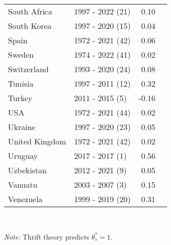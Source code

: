 \begin{table}[H]
{{\begin{tabular}{llrr}
South Africa & 1997 - 2022 (21) & 0.10\\
South Korea & 1997 - 2020 (15) & 0.04\\
Spain & 1972 - 2021 (42) & 0.06\\
\addlinespace
Sweden & 1974 - 2022 (41) & 0.02\\
Switzerland & 1993 - 2020 (24) & 0.08\\
Tunisia & 1997 - 2011 (12) & 0.32\\
Turkey & 2011 - 2015 (5) & -0.16\\
USA & 1972 - 2021 (44) & 0.02\\
\addlinespace
Ukraine & 1997 - 2020 (23) & 0.05\\
United Kingdom & 1972 - 2021 (42) & 0.02\\
Uruguay & 2017 - 2017 (1) & 0.56\\
Uzbekistan & 2012 - 2021 (9) & 0.05\\
Vanuatu & 2003 - 2007 (3) & 0.15\\
\addlinespace
Venezuela & 1999 - 2019 (20) & 0.31\\
\end{tabular}

}

}
\\
\hline
\label{tbl-indicator_table}
\begin{flushleft}
\footnotesize \emph{Note:} Thrift theory predicts \(\theta_s^* = 1\).
\end{flushleft}
\end{table}
